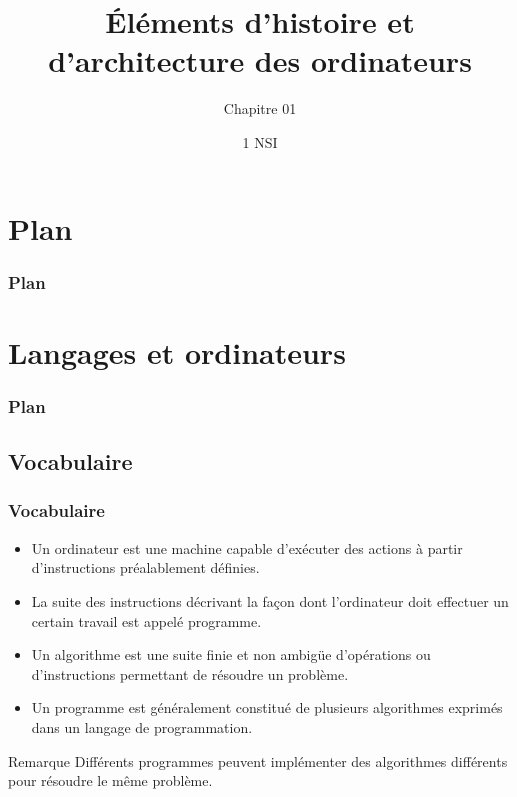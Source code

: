 \documentclass[utf8,10pt]{beamer}
\title{Éléments d'histoire et d'architecture des ordinateurs}
\subtitle{Chapitre 01}
\author{1 NSI}
\date{}
\begin{document}
\begin{frame}
    \titlepage
\end{frame}


\section*{Plan}
\begin{frame}

	\frametitle{Plan}
	
	\tableofcontents
\end{frame}

\section{Langages et ordinateurs}

\begin{frame}

	\frametitle{Plan}
	
	\tableofcontents[currentsection]
\end{frame}

\subsection{Vocabulaire}
\begin{frame}
    \frametitle{Vocabulaire}
    \begin{itemize}
        \item Un \alert{ordinateur} est une machine capable d'exécuter des actions
        à partir d'instructions préalablement définies.
        
        \item La suite des instructions décrivant la façon dont l'ordinateur doit effectuer
        un certain travail est appelé \alert{programme}.
        
        \item Un \alert{algorithme} est une suite finie et non ambigüe d'opérations ou 
        d'instructions permettant de résoudre un problème.
        
        \item Un programme est généralement constitué de plusieurs algorithmes exprimés dans un
        \alert{langage de programmation}.
    \end{itemize}
    
    \begin{exampleblock}{Remarque}
        Différents programmes peuvent implémenter des algorithmes différents pour résoudre
        le même problème.
    \end{exampleblock}
\end{frame}
\end{document}
